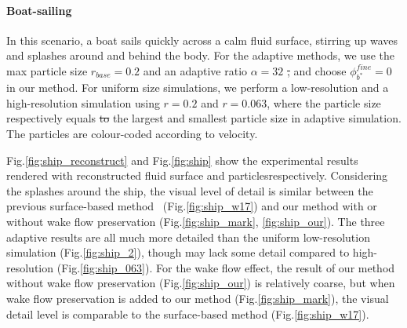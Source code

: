 \documentclass[VANCOUVER,STIX1COL]{WileyNJD-v2}
\providecommand{\DIFadd}[1]{{\protect\color{blue}\uwave{#1}}} %
\providecommand{\DIFdel}[1]{{\protect\color{red}\sout{#1}}}                      %
\providecommand{\DIFaddbegin}{} %
\providecommand{\DIFaddend}{} %
\providecommand{\DIFdelbegin}{} %
\providecommand{\DIFdelend}{} %
\begin{document}
\paragraph{Boat-sailing}

In this scenario, a boat sails quickly across a calm fluid surface, stirring up waves and splashes around and behind the body. For the adaptive methods, we use the max particle size $r_{base} = 0.2$ and an adaptive ratio $\alpha = 32$ \DIFdelbegin \DIFdel{, }\DIFdelend and choose $\phi_{b^*}^{fine} = 0$ in our method. For uniform size simulations, we perform a low-resolution and a high-resolution simulation using $r = 0.2$ and $r = 0.063$, where the particle size respectively equals \DIFdelbegin \DIFdel{to }\DIFdelend the largest and smallest particle size in adaptive simulation. The particles are colour-coded according to velocity.

Fig.\ref{fig:ship_reconstruct} and Fig.\ref{fig:ship} show the experimental results rendered with reconstructed fluid surface and particles\DIFaddbegin \DIFadd{, }\DIFaddend respectively. Considering the splashes around the ship, the visual level of detail is similar between the previous surface-based method~\cite{Winchenbach17} (Fig.\ref{fig:ship_w17}) and our method with or without wake flow preservation (Fig.\ref{fig:ship_mark}, \ref{fig:ship_our}). The three adaptive results are all much more detailed than the uniform low-resolution simulation (Fig.\ref{fig:ship_2}), though \DIFaddbegin \DIFadd{they }\DIFaddend may lack some detail compared to high-resolution (Fig.\ref{fig:ship_063}). For the wake flow effect, the result of our method without wake flow preservation (Fig.\ref{fig:ship_our}) is relatively coarse, but when wake flow preservation is added to our method (Fig.\ref{fig:ship_mark}), the visual detail level is comparable to the surface-based method (Fig.\ref{fig:ship_w17}).

\DIFdelbegin %
\end{document}
